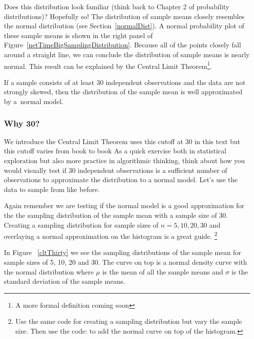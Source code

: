 Does this distribution look familiar (think back to Chapter 2 of probability distributions)? Hopefully so! The distribution of sample means closely resembles the normal distribution (see Section~\ref{normalDist}). A normal probability plot of these sample means is shown in the right panel of Figure~\ref{netTimeBigSamplingDistribution}. Because all of the points closely fall around a straight line, we can conclude the distribution of sample means is nearly normal. This result can be explained by the Central Limit Theorem\footnote{A more formal definition coming soon}.

\begin{termBox}{
If a sample consists of at least 30 independent observations and the data are not strongly skewed, then the distribution of the sample mean is well approximated by a~normal model.}
\end{termBox}

\subsubsection{Why 30?}
\label{why30}

We introduce the Central Limit Theorem uses this cutoff at 30 in this text but this cutoff varies from book to book  As a quick exercise both in statistical exploration but also more practice in algorithmic thinking, think about how you would visually test if 30 independent observations is a sufficient number of observations to approximate the distribution to a normal model. Let's use the  data to sample from like before. 

Again remember we are testing if the normal model is a good approximation for the the sampling distribution of the sample mean with a sample size of 30. Creating a sampling distribution for sample sizes of $n=5,10,20,30$ and overlaying a normal approximation on the histogram is a great guide. \footnote{Use the same code for creating a sampling distribution but vary the sample size. Then use the code: 
 to add the normal curve on top of the histogram.}

In Figure ~\ref{cltThirty} we see the sampling distributions of the sample mean for sample sizes of 5, 10, 20 and 30. The curve on top is a normal density curve with the normal distribution where $\mu$ is the mean of all the sample means and $\sigma$ is the standard deviation of the sample means.

